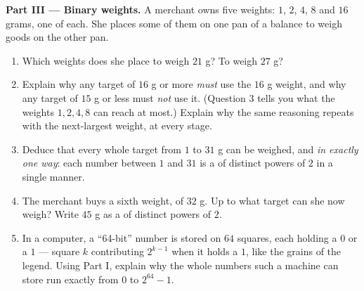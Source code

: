 \begin{problem}[{Weekend problem --- the geometric \omterm{def:g1:addition:def}{sum}
$1 + 2 + 4 + \dots + 2^{n-1} = 2^n - 1$, from a famous legend to
binary numbers}]
\medskip
\noindent\textbf{Part III --- Binary weights.}
A merchant owns five weights: $1$, $2$, $4$, $8$ and $16$ grams,
one of each. She places some of them on one pan of a balance to
weigh goods on the other pan.
\begin{enumerate}[resume]
  \item Which weights does she place to weigh $21$ g? To weigh
        $27$ g?
  \item Explain why any target of $16$ g or more \emph{must} use
        the $16$ g weight, and why any target of $15$ g or less
        must \emph{not} use it. (Question 3 tells you what the
        weights $1, 2, 4, 8$ can reach at most.) Explain why the
        same reasoning repeats with the next-largest weight, at
        every stage.
  \item Deduce that every whole target from $1$ to $31$ g can be
        weighed, and \emph{in exactly one way}: each number
        between $1$ and $31$ is a  of distinct powers of $2$ in
        a single manner.
  \item The merchant buys a sixth weight, of $32$ g. Up to what
        target can she now weigh? Write $45$ g as a  of
        distinct powers of $2$.
  \item In a computer, a ``64-bit'' number is stored on $64$
        squares, each holding a $0$ or a $1$ --- square $k$
        contributing $2^{k-1}$ when it holds a $1$, like the
        grains of the legend. Using Part I, explain why the whole
        numbers such a machine can store run exactly from $0$ to
        $2^{64} - 1$.
\end{enumerate}
\end{problem}
